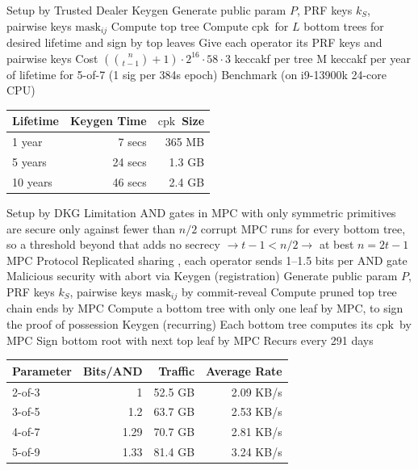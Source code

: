 \documentclass[t]{beamer}
\makeatletter
\newcommand{\cpk}{\ensuremath{\mathrm{cpk}}}\newcommand{\mask}{\mathrm{mask}}
\newcommand{\tbl}[3]{\begin{tabular}[t]{@{}#1@{}}#2\\[-\arrayrulewidth]\hline#3\end{tabular}}
\makeatother
\begin{document}
\begin{slide}{Setup by Trusted Dealer}
\1 Keygen
  \2 Generate public param $P$, PRF keys $k_S$, pairwise keys $\mask_{ij}$
  \2 Compute top tree
  \2 Compute \cpk\ for $L$ bottom trees for desired lifetime and sign by top leaves
  \2 Give each operator its PRF keys and pairwise keys
\1 Cost
  \2 $(\binom{n}{t-1} + 1) \cdot 2^{16} \cdot 58 \cdot 3$ keccakf per tree
   M keccakf per year of lifetime for 5-of-7 (1 sig per 384s epoch)
\1 Benchmark (on i9-13900k 24-core CPU)
  \2[] \tbl{lrr}{Lifetime & Keygen Time & \cpk\ Size}{
    1 year & 7 secs & 365 MB \\
    5 years & 24 secs & 1.3 GB \\
    10 years & 46 secs & 2.4 GB}
\end{slide}


\begin{slide}[.5]{Setup by DKG}
\1 Limitation
  \2 AND gates in MPC with only symmetric primitives are secure only against fewer than $n/2$ corrupt
  \2 MPC runs for every bottom tree, so a threshold beyond that adds no secrecy $\rightarrow t-1 < n/2 \rightarrow$ at best $n = 2t-1$
\1 MPC Protocol
  \2 Replicated sharing \cite{CDI05}, each operator sends 1--1.5 bits per AND gate
  \2 Malicious security with abort via \cite{GS20}
\1 Keygen (registration)
  \2 Generate public param $P$, PRF keys $k_S$, pairwise keys $\mask_{ij}$ by commit-reveal
  \2 Compute pruned top tree chain ends by MPC
  \2 Compute a bottom tree with only one leaf by MPC, to sign the proof of possession
\1 Keygen (recurring)
  \2 Each bottom tree computes its \cpk\ by MPC
  \2 Sign bottom root with next top leaf by MPC
  \2 Recurs every 291 days
\side[10]
\tbl{lrrr}{Parameter & Bits/AND & Traffic & Average Rate}{
  2-of-3 & 1 & 52.5 GB & 2.09 KB/s \\
  3-of-5 & 1.2 & 63.7 GB & 2.53 KB/s \\
  4-of-7 & 1.29 & 70.7 GB & 2.81 KB/s \\
  5-of-9 & 1.33 & 81.4 GB & 3.24 KB/s}
\end{slide}

\end{document}
